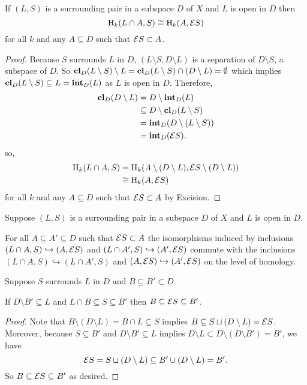 \begin{lemma}\label{lem:excision}
  If $(L, S)$ is a surrounding pair in a subspace $D$ of $X$ and $L$ is open in $D$ then
  \[ \mathrm{H}_k(L\cap A, S) \cong \mathrm{H}_k(A, \mathcal{E} S) \]
  for all $k$ and any $A\subseteq D$ such that $\mathcal{E} S\subset A$.
\end{lemma}
\begin{proof}
  Because $S$ surrounds $L$ in $D$, $(L\setminus S, D\setminus L)$ is a separation of $D\setminus S$, a subspace of $D$.
  So $\mathbf{cl}_D(L\setminus S)\setminus L = \mathbf{cl}_D(L\setminus S) \cap (D\setminus L) = \emptyset$ which implies $\mathbf{cl}_D(L\setminus S)\subseteq L = \mathbf{int}_D(L)$ as $L$ is open in $D$.
  Therefore,
  \begin{align*}
    \mathbf{cl}_D(D\setminus L) &= D\setminus \mathbf{int}_D(L)\\
                        &\subseteq D\setminus \mathbf{cl}_D(L\setminus S)\\
                        &= \mathbf{int}_D(D\setminus (L\setminus S))\\
                        &= \mathbf{int}_D(\mathcal{E} S).
  \end{align*}
  so,
  \begin{align*}
    \mathrm{H}_k(L\cap A, S) &= \mathrm{H}_k(A\setminus (D\setminus L), \mathcal{E} S\setminus (D\setminus L))\\
      &\cong \mathrm{H}_k(A, \mathcal{E} S)
  \end{align*}
  for all $k$ and any $A\subseteq D$ such that $\mathcal{E} S\subset A$ by Excision.
\end{proof}

\begin{lemma}\label{lem:excision_commute}
  Suppose $(L, S)$ is a surrounding pair in a subspace $D$ of $X$ and $L$ is open in $D$.

  For all $A\subseteq A'\subseteq D$ such that $\mathcal{E} S\subset A$ the isomorphisms induced by inclusions $(L\cap A, S)\hookrightarrow (A, \mathcal{E} S)$ and $(L\cap A', S)\hookrightarrow (A', \mathcal{E} S)$ commute with the inclusions $(L\cap A, S)\hookrightarrow (L\cap A', S)$ and $(A, \mathcal{E} S)\hookrightarrow (A', \mathcal{E} S)$ on the level of homology.
\end{lemma}

\begin{lemma}\label{lem:surround_and_cover}
  Suppose $S$ surrounds $L$ in $D$ and $B\subseteq B'\subset D$.

  If $D\setminus B'\subseteq L$ and $L\cap B\subseteq S\subseteq B'$ then $B\subseteq \mathcal{E} S\subseteq B'$.
\end{lemma}
\begin{proof}
  Note that $B\setminus (D\setminus L) = B\cap L\subseteq S$ implies $B\subseteq S\sqcup(D\setminus L) = \mathcal{E} S$.
  Moreover, because $S\subseteq B'$ and $D\setminus B'\subseteq L$ implies $D\setminus L \subset D\setminus (D\setminus B') = B'$, we have
  \[ \mathcal{E} S = S\sqcup (D\setminus L) \subseteq B'\cup (D\setminus L) = B'. \]
  So $B \subseteq \mathcal{E} S\subseteq B'$ as desired.
\end{proof}

